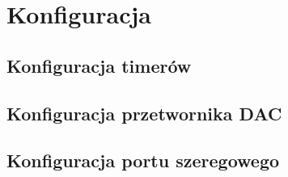 \section{Konfiguracja}
\subsection{Konfiguracja timerów}

\subsection{Konfiguracja przetwornika DAC}

\subsection{Konfiguracja portu szeregowego}